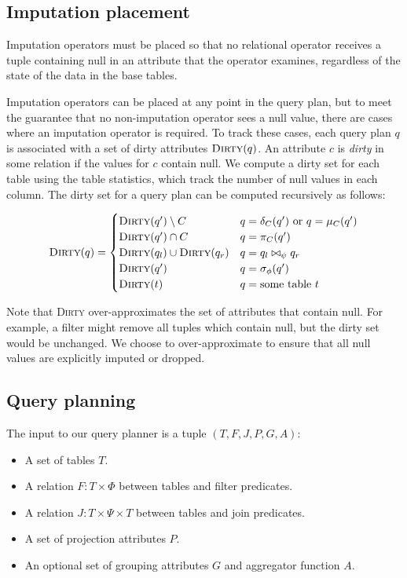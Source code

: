 \subsection{Imputation placement}
\label{sec:placement}
Imputation operators must be placed so that no relational operator receives a tuple containing null in an attribute that the operator examines, regardless of the state of the data in the base tables.

Imputation operators can be placed at any point in the query plan, but to meet the guarantee that no non-imputation operator sees a null value, there are cases where an imputation operator is required. To track these cases, each query plan $q$ is associated with a set of dirty attributes $\textsc{Dirty}(q)$. An attribute $c$ is \emph{dirty} in some relation if the values for $c$ contain null. We compute a dirty set for each table using the table statistics, which track the number of null values in each column. The dirty set for a query plan can be computed recursively as follows:

\begin{align*}
  \textsc{Dirty}(q) = \begin{cases}
    \textsc{Dirty}(q') \setminus C & q = \delta_C(q')\ \text{or}\ q = \mu_C(q') \\
    \textsc{Dirty}(q') \cap C & q = \pi_C(q') \\
    \textsc{Dirty}(q_l) \cup \textsc{Dirty}(q_r) & q = q_l \bowtie_\psi q_r \\
    \textsc{Dirty}(q') & q = \sigma_\phi(q') \\
    \textsc{Dirty}(t) & q = \text{some table}\ t \\
  \end{cases}
\end{align*}

Note that \textsc{Dirty} over-approximates the set of attributes that contain null. For example, a filter might remove all tuples which contain null, but the dirty set would be unchanged. We choose to over-approximate to ensure that all null values are explicitly imputed or dropped.

\subsection{Query planning}
The input to our query planner is a tuple $(T, F, J, P, G, A)$:
\begin{itemize}
\item A set of tables $T$.
\item A relation $F: T \times \Phi$ between tables and filter predicates.
\item A relation $J : T \times \Psi \times T$ between tables and join predicates.
\item A set of projection attributes $P$.
\item An optional set of grouping attributes $G$ and aggregator function $A$.
\end{itemize}

